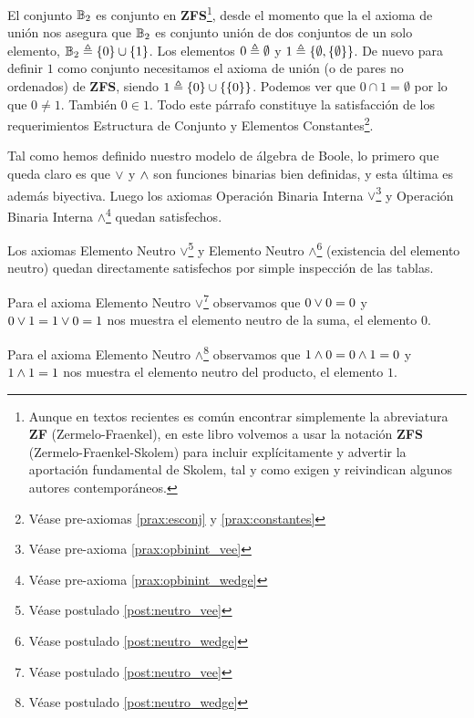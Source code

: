 	El conjunto \({\mathbb{B}}_2\) es conjunto en \textbf{ZFS}\footnote{Aunque en textos recientes es común encontrar simplemente la abreviatura \textbf{ZF} (Zermelo-Fraenkel), en este libro volvemos a usar la notación \textbf{ZFS} (Zermelo-Fraenkel-Skolem) para incluir explícitamente y advertir la aportación fundamental de Skolem, tal y como exigen y reivindican algunos autores contemporáneos.}, desde el momento
que la el axioma de unión nos asegura que \({\mathbb{B}}_2\) es conjunto unión de
dos conjuntos de un solo elemento, \({\mathbb{B}}_2 \triangleq { \{0\} } \cup {
\{1\} } \). Los elementos \(0 \triangleq \emptyset\) y  \(1 \triangleq \{
\emptyset, \{ \emptyset \} \} \). De nuevo para definir \(1\) como conjunto
necesitamos el axioma de unión (o de pares no ordenados) de \textbf{ZFS},
siendo \(1 \triangleq \{0\}\cup\{\{0\}\}\). Podemos ver que \(0 \cap 1 =
\emptyset \) por lo que \(0 \neq 1\). También \(0 \in 1\). Todo este párrafo
constituye la satisfacción de los requerimientos Estructura de Conjunto y Elementos Constantes\footnote{Véase pre-axiomas \ref{prax:esconj} y \ref{prax:constantes}}.



	Tal como hemos definido nuestro modelo de álgebra de Boole, lo primero
que queda claro es que \(\vee\) y \(\wedge\) son funciones binarias
bien definidas, y esta última es además biyectiva. Luego los axiomas
Operación Binaria Interna $\vee$\footnote{Véase pre-axioma \ref{prax:opbinint_vee}} y Operación Binaria Interna $\wedge$\footnote{Véase pre-axioma \ref{prax:opbinint_wedge}} quedan satisfechos. 



	Los axiomas Elemento Neutro $\vee$\footnote{Véase postulado \ref{post:neutro_vee}} y Elemento Neutro $\wedge$\footnote{Véase postulado \ref{post:neutro_wedge}} (existencia del elemento
neutro) quedan directamente satisfechos por simple inspección de las tablas. 



	Para el axioma Elemento Neutro $\vee$\footnote{Véase postulado \ref{post:neutro_vee}} observamos que \(0 \vee 0 = 0\) y
\(0 \vee 1 = 1 \vee 0 = 1\) nos muestra el elemento neutro de
la suma, el elemento \(0\).



	Para el axioma Elemento Neutro $\wedge$\footnote{Véase postulado \ref{post:neutro_wedge}} observamos que \( 1 \wedge 0 =
0 \wedge 1 = 0\) y \(1 \wedge 1 = 1\) nos muestra el elemento
neutro del producto, el elemento \(1\).



